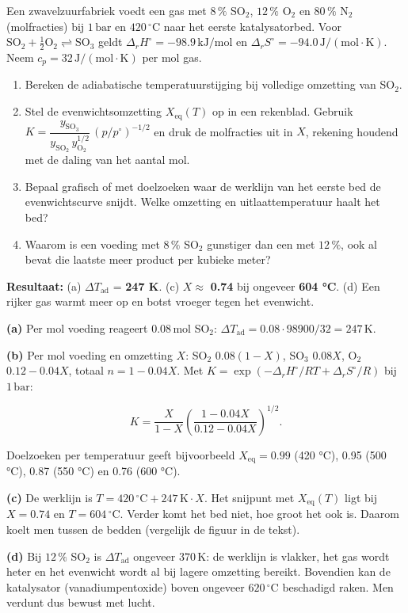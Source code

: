 \begin{oefening}
Een zwavelzuurfabriek voedt een gas met \(8\,\%\) SO\(_2\), \(12\,\%\) O\(_2\) en \(80\,\%\) N\(_2\) (molfracties) bij \(1\,\mathrm{bar}\) en \(420\,^\circ\mathrm{C}\) naar het eerste katalysatorbed. Voor \(\mathrm{SO_2 + \tfrac12 O_2 \rightleftharpoons SO_3}\) geldt \(\Delta_r H^\circ = -98.9\,\mathrm{kJ/mol}\) en \(\Delta_r S^\circ = -94.0\,\mathrm{J/(mol\cdot K)}\). Neem \(c_p = 32\,\mathrm{J/(mol\cdot K)}\) per mol gas.

\begin{enumerate}
\item[(a)]
  Bereken de adiabatische temperatuurstijging bij volledige omzetting van SO\(_2\).
\item[(b)]
  Stel de evenwichtsomzetting \(X_\mathrm{eq}(T)\) op in een rekenblad. Gebruik
  \(K = \dfrac{y_{\mathrm{SO_3}}}{y_{\mathrm{SO_2}}\,y_{\mathrm{O_2}}^{1/2}}\,(p/p^\circ)^{-1/2}\)
  en druk de molfracties uit in \(X\), rekening houdend met de daling van het aantal mol.
\item[(c)]
  Bepaal grafisch of met doelzoeken waar de werklijn van het eerste bed de evenwichtscurve snijdt. Welke omzetting en uitlaattemperatuur haalt het bed?
\item[(d)]
  Waarom is een voeding met \(8\,\%\) SO\(_2\) gunstiger dan een met \(12\,\%\), ook al bevat die laatste meer product per kubieke meter?
\end{enumerate}
\end{oefening}
\begin{oplossing}
\textbf{Resultaat:} (a) \(\Delta T_\mathrm{ad}\) = \textbf{247 K}. (c) \(X \approx\) \textbf{0.74} bij ongeveer \textbf{604 °C}. (d) Een rijker gas warmt meer op en botst vroeger tegen het evenwicht.

\textbf{(a)} Per mol voeding reageert \(0.08\,\mathrm{mol}\) SO\(_2\): \(\Delta T_\mathrm{ad} = 0.08\cdot98900/32 = 247\,\mathrm{K}\).

\textbf{(b)} Per mol voeding en omzetting \(X\): SO\(_2\) \(0.08(1-X)\), SO\(_3\) \(0.08X\), O\(_2\) \(0.12 - 0.04X\), totaal \(n = 1 - 0.04X\). Met \(K = \exp(-\Delta_r H^\circ/RT + \Delta_r S^\circ/R)\) bij \(1\,\mathrm{bar}\):

\[
K = \frac{X}{1-X}\left(\frac{1-0.04X}{0.12-0.04X}\right)^{1/2}.
\]

Doelzoeken per temperatuur geeft bijvoorbeeld \(X_\mathrm{eq} = 0.99\) (420 °C), 0.95 (500 °C), 0.87 (550 °C) en 0.76 (600 °C).

\textbf{(c)} De werklijn is \(T = 420\,^\circ\mathrm{C} + 247\,\mathrm{K}\cdot X\). Het snijpunt met \(X_\mathrm{eq}(T)\) ligt bij \(X = 0.74\) en \(T = 604\,^\circ\mathrm{C}\). Verder komt het bed niet, hoe groot het ook is. Daarom koelt men tussen de bedden (vergelijk de figuur in de tekst).

\textbf{(d)} Bij \(12\,\%\) SO\(_2\) is \(\Delta T_\mathrm{ad}\) ongeveer \(370\,\mathrm{K}\): de werklijn is vlakker, het gas wordt heter en het evenwicht wordt al bij lagere omzetting bereikt. Bovendien kan de katalysator (vanadiumpentoxide) boven ongeveer \(620\,^\circ\mathrm{C}\) beschadigd raken. Men verdunt dus bewust met lucht.
\end{oplossing}
